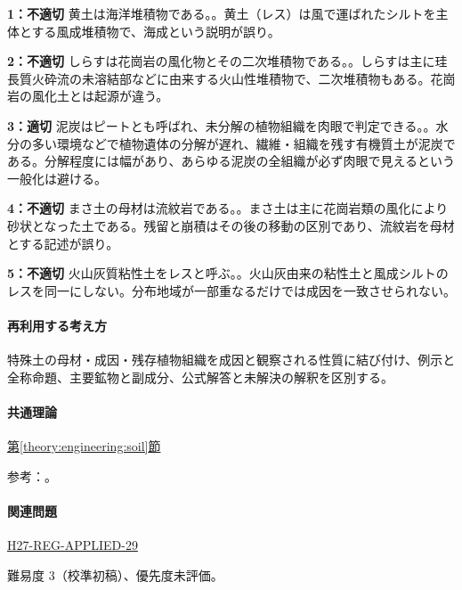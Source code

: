 \noindent\textbf{1：不適切} 黄土は海洋堆積物である。。黄土（レス）は風で運ばれたシルトを主体とする風成堆積物で、海成という説明が誤り。\par

\noindent\textbf{2：不適切} しらすは花崗岩の風化物とその二次堆積物である。。しらすは主に珪長質火砕流の未溶結部などに由来する火山性堆積物で、二次堆積物もある。花崗岩の風化土とは起源が違う。\par

\noindent\textbf{3：適切} 泥炭はピートとも呼ばれ、未分解の植物組織を肉眼で判定できる。。水分の多い環境などで植物遺体の分解が遅れ、繊維・組織を残す有機質土が泥炭である。分解程度には幅があり、あらゆる泥炭の全組織が必ず肉眼で見えるという一般化は避ける。\par

\noindent\textbf{4：不適切} まさ土の母材は流紋岩である。。まさ土は主に花崗岩類の風化により砂状となった土である。残留と崩積はその後の移動の区別であり、流紋岩を母材とする記述が誤り。\par

\noindent\textbf{5：不適切} 火山灰質粘性土をレスと呼ぶ。。火山灰由来の粘性土と風成シルトのレスを同一にしない。分布地域が一部重なるだけでは成因を一致させられない。\par

\paragraph{再利用する考え方} 特殊土の母材・成因・残存植物組織を成因と観察される性質に結び付け、例示と全称命題、主要鉱物と副成分、公式解答と未解決の解釈を区別する。

\paragraph{共通理論} \hyperref[theory:engineering:soil]{第\ref*{theory:engineering:soil}節}

\par 参考：\cite{mlit_masa,maff_shiras2017,mlit_peat,gsj_loess2002}。

\paragraph{関連問題} \hyperref[q:h27-reg-applied-29]{H27-REG-APPLIED-29}

\par 難易度 3（校準初稿）、優先度未評価。

